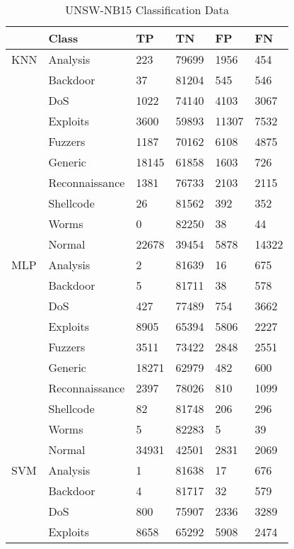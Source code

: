 \begin{longtable}{@{}llllll@{}}
\caption{UNSW-NB15 Classification Data} \\
\toprule
        & Class          & TP    & TN    & FP    & FN    \\ \midrule
KNN     & Analysis       & 223   & 79699 & 1956  & 454   \\
        & Backdoor       & 37    & 81204 & 545   & 546   \\
        & DoS            & 1022  & 74140 & 4103  & 3067  \\
        & Exploits       & 3600  & 59893 & 11307 & 7532  \\
        & Fuzzers        & 1187  & 70162 & 6108  & 4875  \\
        & Generic        & 18145 & 61858 & 1603  & 726   \\
        & Reconnaissance & 1381  & 76733 & 2103  & 2115  \\
        & Shellcode      & 26    & 81562 & 392   & 352   \\
        & Worms          & 0     & 82250 & 38    & 44    \\
        & Normal         & 22678 & 39454 & 5878  & 14322 \\
MLP     & Analysis       & 2     & 81639 & 16    & 675   \\
        & Backdoor       & 5     & 81711 & 38    & 578   \\
        & DoS            & 427   & 77489 & 754   & 3662  \\
        & Exploits       & 8905  & 65394 & 5806  & 2227  \\
        & Fuzzers        & 3511  & 73422 & 2848  & 2551  \\
        & Generic        & 18271 & 62979 & 482   & 600   \\
        & Reconnaissance & 2397  & 78026 & 810   & 1099  \\
        & Shellcode      & 82    & 81748 & 206   & 296   \\
        & Worms          & 5     & 82283 & 5     & 39    \\
        & Normal         & 34931 & 42501 & 2831  & 2069  \\
SVM     & Analysis       & 1     & 81638 & 17    & 676   \\
        & Backdoor       & 4     & 81717 & 32    & 579   \\
        & DoS            & 800   & 75907 & 2336  & 3289  \\
        & Exploits       & 8658  & 65292 & 5908  & 2474  \\

\end{longtable}

